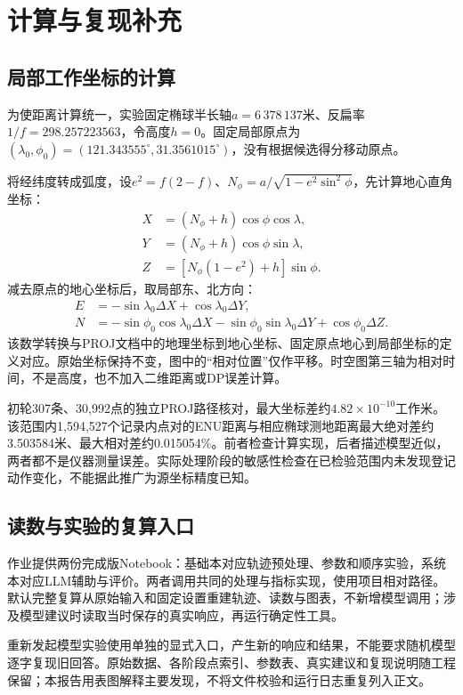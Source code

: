 \section{计算与复现补充}
\label{sec:appendix}

\subsection{局部工作坐标的计算}
为使距离计算统一，实验固定椭球半长轴$a=6\,378\,137$米、反扁率$1/f=298.257223563$，令高度$h=0$。固定局部原点为$(\lambda_0,\phi_0)=(121.343555^\circ,31.3561015^\circ)$，没有根据候选得分移动原点。

将经纬度转成弧度，设$e^2=f(2-f)$、$N_\phi=a/\sqrt{1-e^2\sin^2\phi}$，先计算地心直角坐标：
\begin{align*}
X&=(N_\phi+h)\cos\phi\cos\lambda,\\
Y&=(N_\phi+h)\cos\phi\sin\lambda,\\
Z&=[N_\phi(1-e^2)+h]\sin\phi.
\end{align*}
减去原点的地心坐标后，取局部东、北方向：
\begin{align*}
E&=-\sin\lambda_0\Delta X+\cos\lambda_0\Delta Y,\\
N&=-\sin\phi_0\cos\lambda_0\Delta X-\sin\phi_0\sin\lambda_0\Delta Y+\cos\phi_0\Delta Z.
\end{align*}
该数学转换与PROJ文档中的地理坐标到地心坐标、固定原点地心到局部坐标的定义对应\cite{proj-cart,proj-topo}。原始坐标保持不变，图中的“相对位置”仅作平移。时空图第三轴为相对时间，不是高度，也不加入二维距离或DP误差计算。

初轮307条、30,992点的独立PROJ路径核对，最大坐标差约$4.82\times10^{-10}$工作米。该范围内1,594,527个记录内点对的ENU距离与相应椭球测地距离最大绝对差约3.503584米、最大相对差约0.015054\%。前者检查计算实现，后者描述模型近似，两者都不是仪器测量误差。实际处理阶段的敏感性检查在已检验范围内未发现登记动作变化，不能据此推广为源坐标精度已知。

\subsection{读数与实验的复算入口}
作业提供两份完成版Notebook：基础本对应轨迹预处理、参数和顺序实验，系统本对应LLM辅助与评价。两者调用共同的处理与指标实现，使用项目相对路径。默认完整复算从原始输入和固定设置重建轨迹、读数与图表，不新增模型调用；涉及模型建议时读取当时保存的真实响应，再运行确定性工具。

重新发起模型实验使用单独的显式入口，产生新的响应和结果，不能要求随机模型逐字复现旧回答。原始数据、各阶段点索引、参数表、真实建议和复现说明随工程保留；本报告用表图解释主要发现，不将文件校验和运行日志重复列入正文。

